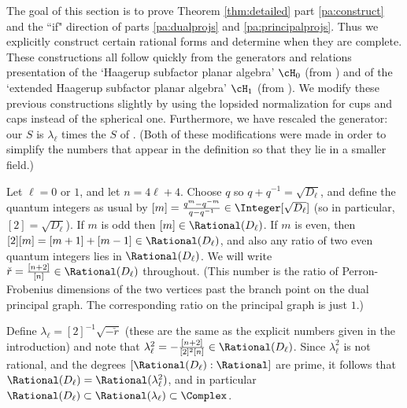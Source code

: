 
The goal of this section is to prove Theorem \ref{thm:detailed} part \ref{pa:construct} and the ``if" direction of parts \ref{pa:dualprojs} and \ref{pa:principalprojs}.   Thus we explicitly construct certain rational forms and determine when they are complete.  These constructions all follow quickly from the generators and relations presentation of the `Haagerup subfactor planar algebra' $\cH_0$ (from \cite{0902.1294}) and of the `extended Haagerup subfactor planar algebra' $\cH_1$ (from \cite{0909.4099}).   We modify these previous constructions slightly by using the lopsided normalization for cups and caps instead of the spherical one.  Furthermore, we have rescaled the generator: our $S$ is $\lambda_\ell$ times the $S$ of \cite{0909.4099, 0902.1294}.  (Both of these modifications were made in order to simplify the numbers that appear in the definition so that they lie in a smaller field.)

Let $\ell=0$ or $1$, and let $n=4\ell+4$.  Choose $q$ so $q+q^{-1}=\sqrt{D_\ell}$, and define the quantum integers as usual by $[m]=\frac{q^m - q^{-m}}{q-q^{-1}} \in \Integer[\sqrt{D_\ell}]$ (so in particular, $[2] = \sqrt{D_\ell}$).  
If $m$ is odd then $[m] \in \Rational(D_\ell)$.  If $m$ is even, then $[2][m] = [m+1]+[m-1]\in \Rational(D_\ell)$, and also any ratio of two even quantum integers lies in $\Rational(D_\ell)$.  We will write $\check{r} = \frac{[n+2]}{[n]} \in \Rational(D_\ell)$ throughout. (This number is the ratio of Perron-Frobenius dimensions of the two vertices past the branch point on the dual principal graph. The corresponding ratio on the principal graph is just $1$.)

Define $\lambda_\ell = [2]^{-1}\sqrt{-\check{r}}$ (these are the same as the explicit numbers given in the introduction) and note that $\lambda_\ell^2 = - \frac{[n+2]}{[2]^2[n]} \in \Rational(D_\ell)$. 
Since $\lambda_\ell^2$ is not rational, and the degrees $[\Rational(D_\ell):\Rational]$ are prime, it follows that $\Rational(D_\ell) = \Rational(\lambda_\ell^2)$, and in particular 
$\Rational(D_\ell) \subset \Rational(\lambda_\ell) \subset \Complex$. 

